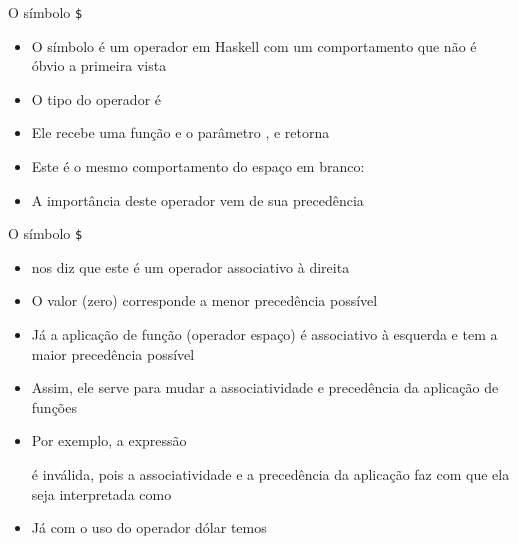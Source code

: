 \begin{frame}[fragile]{O símbolo {\tt \$}} 

    \begin{itemize}
        \item O símbolo   é um operador em Haskell com um comportamento
            que não é óbvio a primeira vista

        \item O tipo do operador  é


        \item Ele recebe uma função  e o parâmetro ,
            e retorna 

        \item Este é o mesmo comportamento do espaço em branco:


        \item A importância deste operador vem de sua precedência

    \end{itemize}

\end{frame}

\begin{frame}[fragile]{O símbolo {\tt \$}} 

    \begin{itemize}
        \item {} nos diz que este é um operador associativo à direita

        \item O valor  (zero) corresponde a menor precedência possível

        \item Já a aplicação de função (operador espaço) é associativo à esquerda e tem a
            maior precedência possível

        \item Assim, ele serve para mudar a associatividade e precedência da aplicação de funções

        \item Por exemplo, a expressão


        é inválida, pois a associatividade e a precedência da aplicação faz com que ela seja
         interpretada como


        \item Já com o uso do operador dólar temos

    \end{itemize}

\end{frame}

